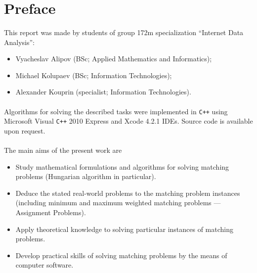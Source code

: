 \section{Preface}

\paragraph{}
	This report was made by students of group 172m specialization ``Internet Data Analysis'':

\begin{itemize}
	\item Vyacheslav Alipov (BSc; Applied Mathematics and Informatics);
	\item Michael Kolupaev (BSc; Information Technologies);
	\item Alexander Kouprin (specialist; Information Technologies).
\end{itemize}

\paragraph{}
	Algorithms for solving the described tasks were implemented in \verb!C++! using Microsoft Visual \verb!C++! 2010 Express and Xcode 4.2.1 IDEs. Source code is available upon request.

\paragraph{}
	The main aims of the present work are 
\begin{itemize}
	\item Study mathematical formulations and algorithms for solving matching problems (Hungarian algorithm in particular).
	\item Deduce the stated real-world problems to the matching problem instances (including minimum and maximum weighted matching problems --- Assignment Problems).
	\item Apply theoretical knowledge to solving particular instances of matching problems.
	\item Develop practical skills of solving matching problems by the means of computer software.
\end{itemize}
